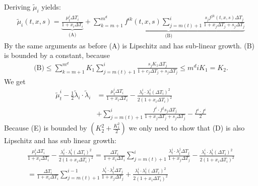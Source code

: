\documentclass[12pt]{article}
\begin{document}
Deriving $\tilde{\mu}_i$ yields:
\begin{align*}
	\tilde{\mu}_i\left(t,x, s\right) = \underbrace{\frac{\mu^i_t \Delta T_i }{1 + x_i\Delta T_i}}_{\text{(A)}} + \underbrace{\sum_{k=m+1}^{m^d}f^{i k}(t,x,s) \sum_{j=m(t)+1}^{i}\frac{s_j f^{j k}(t,x,s)\Delta T_j}{1 + x_j\Delta T_j + s_j \Delta T_j}}_{\text{(B)}}
\end{align*}
By the same arguments as before (A) is Lipschitz and has sub-linear growth. (B) is bounded by a constant, because
\begin{align*}
	\text{(B)} \le \sum_{k=m+1}^{m^d}K_1 \sum_{j=m(t)+1}^{i}\frac{s_j K_1\Delta T_j}{1 + c_j\Delta T_j + s_j \Delta T_j} \le m^diK_1 = K_2.\tag{C}
\end{align*}
We get
\begin{align*}
	\tilde{\mu}^i_t - \frac{1}{2}\tilde{\lambda}_i\cdot \tilde{\lambda}_i &= \frac{\mu^i_t \Delta T_i }{1 + x_i\Delta T_i} - \frac{\lambda^{i}_t \cdot\lambda^{i}_t (\Delta T_i)^2}{2(1 + x_i\Delta T_i)^2}\tag{D}\\
	&+ \sum_{j=m(t)+1}^{i} \frac{f^{i}\cdot f^{j}s_j\Delta T_j}{1 + x_j \Delta T_j + s_j \Delta T_j} - \frac{f^i \cdot f^i}{2}\tag{E}
\end{align*}
Because (E) is bounded by $(K_2^2 + \frac{K_1^2}{2})$ we only need to show that (D) is also Lipschitz and has sub linear growth:
\begin{align*}
	\frac{\mu^i_t \Delta T_i }{1 + x_i\Delta T_i} - \frac{\lambda^{i}_t \cdot\lambda^{i}_t (\Delta T_i)^2}{2(1 + x_i\Delta T_i)^2} = \frac{\Delta T_i }{1 + x_i\Delta T_i}\sum_{j=m(t)+1}^{i}\frac{\lambda^{i}_t \cdot\lambda^{j}_t \Delta T_j}{1 + x_j\Delta T_j} - \frac{\lambda^{i}_t \cdot\lambda^{i}_t (\Delta T_i)^2}{2(1 + x_i\Delta T_i)^2}\\
	= \frac{\Delta T_i }{1 + x_i\Delta T_i}\sum_{j=m(t)+1}^{i - 1}\frac{\lambda^{i}_t \cdot\lambda^{j}_t \Delta T_j}{1 + x_j\Delta T_j} + \frac{\lambda^{i}_t \cdot\lambda^{i}_t (\Delta T_i)^2}{2(1 + x_i\Delta T_i)^2}
\end{align*}
\end{document}
